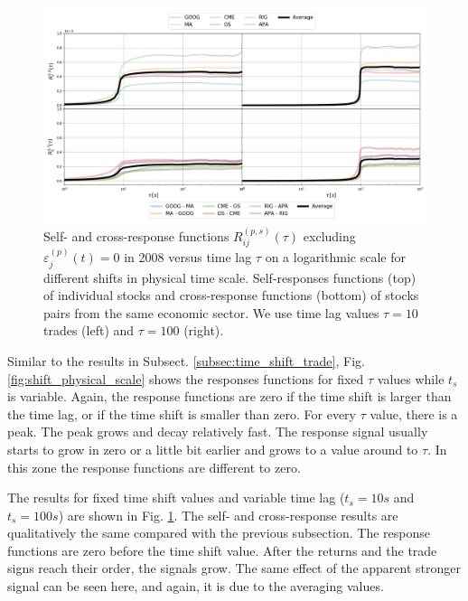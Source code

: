 \begin{figure}[htbp]
    \centering
    \includegraphics[width=\textwidth]{figures/04_shift_responses_physical.png}
    \caption{Self- and cross-response functions
             $R^{\left(p, s\right)}_{ij}\left(\tau\right)$ excluding
             $\varepsilon^{\left(p\right)}_{j}\left(t\right) = 0$ in 2008
             versus time lag $\tau$ on a logarithmic scale for different shifts
             in physical time scale. Self-responses functions (top) of
             individual stocks and cross-response functions (bottom) of stocks
             pairs from the same economic sector. We use time lag values
             $\tau=10$ trades (left) and $\tau=100$ (right).}
    \label{fig:shift_responses_physical_scale}
\end{figure}

Similar to the results in Subsect. \ref{subsec:time_shift_trade}, Fig.
\ref{fig:shift_physical_scale} shows the responses functions for fixed $\tau$
values while $t_{s}$ is variable. Again, the response functions are zero if the
time shift is larger than the time lag, or if the time shift is smaller than
zero. For every $\tau$ value, there is a peak. The peak grows and decay
relatively fast. The response signal usually starts to grow in zero or a little
bit earlier and grows to a value around to $\tau$. In this zone the response
functions are different to zero.

The results for fixed time shift values and variable time lag ($t_{s}=10s$ and
$t_{s}=100s$) are shown in Fig. \ref{fig:shift_responses_physical_scale}. The
self- and cross-response results are qualitatively the same compared with the
previous subsection. The response functions are zero before the time shift
value. After the returns and the trade signs reach their order, the signals
grow. The same effect of the apparent stronger signal can be seen here, and
again, it is due to the averaging values.

